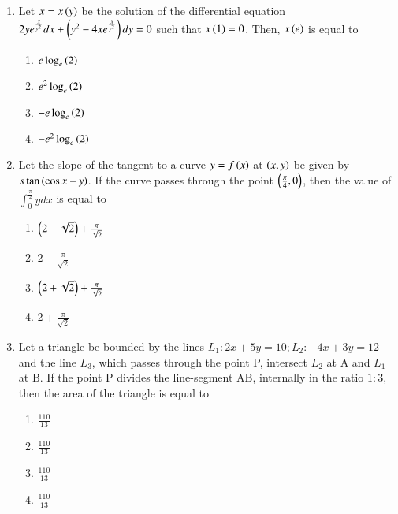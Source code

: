 \documentclass[journal]{IEEEtran}
\begin{document}
\begin{enumerate}
    \item Let $x=x\left(y\right)$ be the solution of the differential equation $2ye^{\frac{x}{y^2}}dx+\left(y^2-4xe^{\frac{x}{y^2}}\right)dy=0$ such that $x\left(1\right)=0$. Then, $x\left(e\right)$ is equal to
    
        \begin{multicols}{4}
            \begin{enumerate}
                \item $e\log_e\left(2\right)$
                \item $e^2\log_e\left(2\right)$
                \item $-e\log_e\left(2\right)$
                \item $-e^2\log_e\left(2\right)$
            \end{enumerate}
        \end{multicols}
        
    \item Let the slope of the tangent to a curve $y=f\left(x\right)$ at $\left(x,y\right)$ be given by $s\tan\left(\cos x-y\right)$. If the curve passes through the point $\left(\frac{\pi}{4},0\right)$, then the value of $\int_0^{\frac{\pi}{2}}ydx$ is equal to

        \begin{multicols}{4}
            \begin{enumerate}
                \item $\left(2-\sqrt{2}\right)+\frac{\pi}{\sqrt{2}}$
                \item $2-\frac{\pi}{\sqrt{2}}$
                \item $\left(2+\sqrt{2}\right)+\frac{\pi}{\sqrt{2}}$
                \item $2+\frac{\pi}{\sqrt{2}}$
            \end{enumerate}
        \end{multicols}

    \item Let a triangle be bounded by the lines $L_1:2x+5y=10;L_2:-4x+3y=12$ and the line $L_3$, which passes through the point P, intersect $L_2$ at A and $L_1$ at B. If the point P divides the line-segment AB, internally in the ratio $1:3$, then the area of the triangle is equal to

        \begin{multicols}{4}
            \begin{enumerate}
                \item $\frac{110}{13}$
                \item $\frac{110}{13}$
                \item $\frac{110}{13}$
                \item $\frac{110}{13}$
            \end{enumerate}
        \end{multicols}
        

\end{enumerate}
\end{document}
